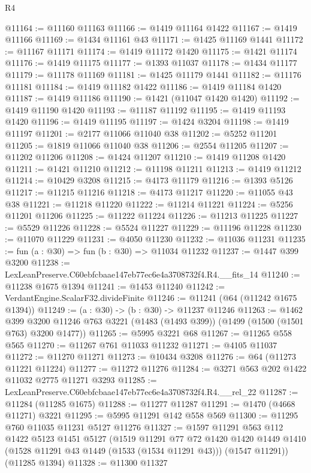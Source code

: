 \begin{lexlean}{R4}
\begin{coremodule}
@11164 := @11160 @11163
@11166 := @1419 @11164 @1422
@11167 := @1419 @11166
@11169 := @1434 @11161 @43
@11171 := @1425 @11169 @1441
@11172 := @11167 @11171
@11174 := @1419 @11172 @1420
@11175 := @1421 @11174
@11176 := @1419 @11175
@11177 := @1393 @11037
@11178 := @1434 @11177
@11179 := @11178 @11169
@11181 := @1425 @11179 @1441
@11182 := @11176 @11181
@11184 := @1419 @11182 @1422
@11186 := @1419 @11184 @1420
@11187 := @1419 @11186
@11190 := @1421 (@11047 @1420 @1420)
@11192 := @1419 @11190 @1420
@11193 := @11187 @11192
@11195 := @1419 @11193 @1420
@11196 := @1419 @11195
@11197 := @1424 @3204
@11198 := @1419 @11197
@11201 := @2177 @11066 @11040 @38
@11202 := @5252 @11201
@11205 := @1819 @11066 @11040 @38
@11206 := @2554 @11205
@11207 := @11202 @11206
@11208 := @1424 @11207
@11210 := @1419 @11208 @1420
@11211 := @1421 @11210
@11212 := @11198 @11211
@11213 := @1419 @11212
@11214 := @10429 @3208
@11215 := @4173 @11179
@11216 := @1393 @5126
@11217 := @11215 @11216
@11218 := @4173 @11217
@11220 := @11055 @43 @38
@11221 := @11218 @11220
@11222 := @11214 @11221
@11224 := @5256 @11201 @11206
@11225 := @11222 @11224
@11226 := @11213 @11225
@11227 := @5529 @11226
@11228 := @5524 @11227
@11229 := @11196 @11228
@11230 := @11070 @11229
@11231 := @4050 @11230
@11232 := @11036 @11231
@11235 := fun (a : @30) => fun (b : @30) => @11034 @11232
@11237 := @1447 @399 @3200
@11238 := LexLeanPreserve.C60ebfcbaae147eb77ec6e4a3708732f4.R4.__fits_14
@11240 := @11238 @1675 @1394
@11241 := @1453 @11240
@11242 := VerdantEngine.ScalarF32.divideFinite
@11246 := @11241 (@64 (@11242 @1675 @1394))
@11249 := (a : @30) -> (b : @30) -> @11237 @11246
@11263 := @1462
    @399
    @3200
    @11246
    @763
    @3221
    (@1483 (@1493 @399))
    (@1499 (@1500 (@1501 @763) @3200 @1477))
@11265 := @5995 @3221 @68
@11267 := @11265 @558 @565
@11270 := @11267 @761 @11033 @11232
@11271 := @4105 @11037
@11272 := @11270 @11271
@11273 := @10434 @3208
@11276 := @64 (@11273 @11221 @11224)
@11277 := @11272 @11276
@11284 := @3271 @563 @202 @1422 @11032 @2775 @11271 @3293
@11285 := LexLeanPreserve.C60ebfcbaae147eb77ec6e4a3708732f4.R4.__rel_22
@11287 := @11284 (@11285 @1675)
@11288 := @11277 @11287
@11291 := @1470 (@4668 @11271) @3221
@11295 := @5995 @11291 @142 @558 @569
@11300 := @11295 @760 @11035 @11231 @5127 @11276
@11327 := @1597
    @11291
    @563
    @112
    @1422
    @5123
    @1451
    @5127
    (@1519
      @11291
      @77
      @72
      @1420
      @1420
      @1449
      @1410
      (@1528 @11291 @43 @1449 (@1533 (@1534 @11291 @43)))
      (@1547 @11291))
    (@11285 @1394)
@11328 := @11300 @11327

\end{coremodule}
\end{lexlean}
